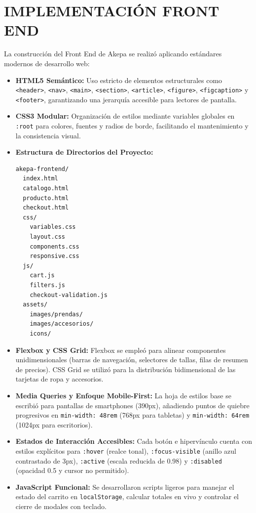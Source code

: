\documentclass[12pt]{article}
\begin{document}
\section*{IMPLEMENTACIÓN FRONT END}
La construcción del Front End de Akepa se realizó aplicando estándares modernos de desarrollo web:
\begin{itemize}
    \item \textbf{HTML5 Semántico:} Uso estricto de elementos estructurales como \texttt{<header>}, \texttt{<nav>}, \texttt{<main>}, \texttt{<section>}, \texttt{<article>}, \texttt{<figure>}, \texttt{<figcaption>} y \texttt{<footer>}, garantizando una jerarquía accesible para lectores de pantalla.
    \item \textbf{CSS3 Modular:} Organización de estilos mediante variables globales en \texttt{:root} para colores, fuentes y radios de borde, facilitando el mantenimiento y la consistencia visual.
    \item \textbf{Estructura de Directorios del Proyecto:}
\begin{verbatim}
akepa-frontend/
  index.html
  catalogo.html
  producto.html
  checkout.html
  css/
    variables.css
    layout.css
    components.css
    responsive.css
  js/
    cart.js
    filters.js
    checkout-validation.js
  assets/
    images/prendas/
    images/accesorios/
    icons/
\end{verbatim}
    \item \textbf{Flexbox y CSS Grid:} Flexbox se empleó para alinear componentes unidimensionales (barras de navegación, selectores de tallas, filas de resumen de precios). CSS Grid se utilizó para la distribución bidimensional de las tarjetas de ropa y accesorios.
    \item \textbf{Media Queries y Enfoque Mobile-First:} La hoja de estilos base se escribió para pantallas de smartphones (390px), añadiendo puntos de quiebre progresivos en \texttt{min-width: 48rem} (768px para tabletas) y \texttt{min-width: 64rem} (1024px para escritorios).
    \item \textbf{Estados de Interacción Accesibles:} Cada botón e hipervínculo cuenta con estilos explícitos para \texttt{:hover} (realce tonal), \texttt{:focus-visible} (anillo azul contrastado de 3px), \texttt{:active} (escala reducida de 0.98) y \texttt{:disabled} (opacidad 0.5 y cursor no permitido).
    \item \textbf{JavaScript Funcional:} Se desarrollaron scripts ligeros para manejar el estado del carrito en \texttt{localStorage}, calcular totales en vivo y controlar el cierre de modales con teclado.
\end{itemize}
\end{document}
